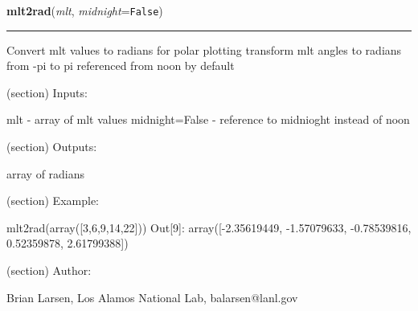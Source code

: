     \label{spacepy:toolbox:mlt2rad}

    \vspace{0.5ex}

\hspace{.8\funcindent}\begin{boxedminipage}{\funcwidth}

    \raggedright \textbf{mlt2rad}(\textit{mlt}, \textit{midnight}={\tt False})

    \vspace{-1.5ex}

    \rule{\textwidth}{0.5\fboxrule}
\setlength{\parskip}{2ex}
    Convert mlt values to radians for polar plotting transform mlt angles 
    to radians from -pi to pi referenced from noon by default

    (section) Inputs:

      mlt - array of mlt values midnight=False - reference to midnioght 
      instead of noon

    (section) Outputs:

      array of radians

    (section) Example:

      mlt2rad(array([3,6,9,14,22])) Out[9]: array([-2.35619449, 
      -1.57079633, -0.78539816,  0.52359878,  2.61799388])

    (section) Author:

      Brian Larsen, Los Alamos National Lab, balarsen@lanl.gov

\setlength{\parskip}{1ex}
    \end{boxedminipage}

    \label{spacepy:toolbox:rad2mlt}

    \vspace{0.5ex}

